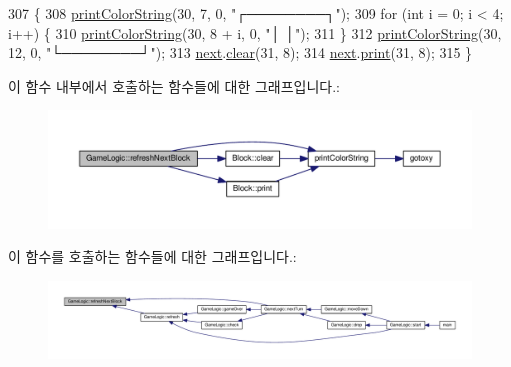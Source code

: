 \begin{DoxyCode}
307                                  \{
308     \hyperlink{myio_8cpp_afce36429cc875312f4476969820ebb51}{printColorString}(30, 7, 0, \textcolor{stringliteral}{"┌────────┐"});
309     \textcolor{keywordflow}{for} (\textcolor{keywordtype}{int} i = 0; i < 4; i++) \{
310         \hyperlink{myio_8cpp_afce36429cc875312f4476969820ebb51}{printColorString}(30, 8 + i, 0, \textcolor{stringliteral}{"│        │"});
311     \}
312     \hyperlink{myio_8cpp_afce36429cc875312f4476969820ebb51}{printColorString}(30, 12, 0, \textcolor{stringliteral}{"└────────┘"});
313     \hyperlink{class_game_logic_a42f7be1948bf9cf0a8ff05d7544f62bc}{next}.\hyperlink{class_block_a5ea55096829ff27961b989409283cd86}{clear}(31, 8);
314     \hyperlink{class_game_logic_a42f7be1948bf9cf0a8ff05d7544f62bc}{next}.\hyperlink{class_block_a6735096bf1a9678a688b98782bd1b226}{print}(31, 8);
315 \}
\end{DoxyCode}


이 함수 내부에서 호출하는 함수들에 대한 그래프입니다.\+:
\nopagebreak
\begin{figure}[H]
\begin{center}
\leavevmode
\includegraphics[width=350pt]{class_game_logic_a81fa5e44fb6dc431c926f7c3fd0b7cdb_cgraph}
\end{center}
\end{figure}




이 함수를 호출하는 함수들에 대한 그래프입니다.\+:
\nopagebreak
\begin{figure}[H]
\begin{center}
\leavevmode
\includegraphics[width=350pt]{class_game_logic_a81fa5e44fb6dc431c926f7c3fd0b7cdb_icgraph}
\end{center}
\end{figure}


